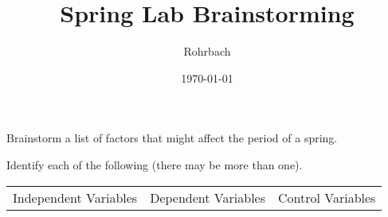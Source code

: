 \documentclass[10pt]{exam}
\title{Spring Lab Brainstorming}
\author{Rohrbach}
\date{\today}
\begin{document}
\maketitle

\begin{questions}


\question
  Brainstorm a list of factors that might affect the period of a spring.
  \vs 

\question
  Identify each of the following (there may be more than one).

  \begin{center}
    \begin{tabular}
      { m{} | m{}| m{} } 
      Independent Variables & 
      Dependent Variables   & 
      Control Variables  \\[8em]
    \end{tabular}
  \end{center}


\end{questions}
\end{document}
